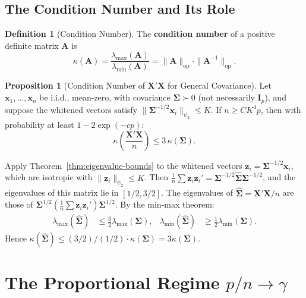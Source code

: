 \documentclass[12pt,a4paper]{article}
\makeatletter
\theoremstyle{definition}
\newtheorem{definition}[theorem]{Definition}
\newtheorem{proposition}[theorem]{Proposition}
\renewenvironment{proof}[1][\proofname]{\par
  \pushQED{\qed}%
  \normalfont \topsep6\p@\@plus6\p@\relax
  \trivlist
  \item[\hskip\labelsep\bfseries #1\@addpunct{.}]\ignorespaces
}{%
  \popQED\endtrivlist\@endpefalse
}
\newcommand{\bX}{\mathbf{X}}
\newcommand{\bx}{\mathbf{x}}
\newcommand{\bI}{\mathbf{I}}
\newcommand{\bz}{\mathbf{z}}
\newcommand{\bA}{\mathbf{A}}
\newcommand{\bSigma}{\boldsymbol{\Sigma}}
\newcommand{\hbSigma}{\hat{\boldsymbol{\Sigma}}}
\newcommand{\opnorm}[1]{\|#1\|_{\mathrm{op}}}
\makeatother
\begin{document}
\subsection{The Condition Number and Its Role}

\begin{definition}[Condition Number]\label{def:condition-number}
The \textbf{condition number} of a positive definite matrix $\bA$ is
\begin{equation}\label{eq:condition-number}
\kappa(\bA) = \frac{\lambda_{\max}(\bA)}{\lambda_{\min}(\bA)} = \opnorm{\bA}\cdot\opnorm{\bA^{-1}}.
\end{equation}
\end{definition}

\begin{proposition}[Condition Number of $\bX'\bX$ for General Covariance]\label{prop:kappa-general}
Let $\bx_1, \ldots, \bx_n$ be i.i.d., mean-zero, with covariance $\bSigma \succ 0$ (not necessarily $\bI_p$), and suppose the whitened vectors satisfy $\|\bSigma^{-1/2}\bx_i\|_{\psi_2} \leqslant K$. If $n \geqslant CK^4 p$, then with probability at least $1 - 2\exp(-cp)$:
\begin{equation}\label{eq:kappa-general}
\kappa\!\left(\frac{\bX'\bX}{n}\right) \leqslant 3\,\kappa(\bSigma).
\end{equation}
\end{proposition}

\begin{proof}
Apply Theorem~\ref{thm:eigenvalue-bounds} to the whitened vectors $\bz_i = \bSigma^{-1/2}\bx_i$, which are isotropic with $\|\bz_i\|_{\psi_2} \leqslant K$. Then $\frac{1}{n}\sum \bz_i\bz_i' = \bSigma^{-1/2}\hbSigma\bSigma^{-1/2}$, and the eigenvalues of this matrix lie in $[1/2, 3/2]$. The eigenvalues of $\hbSigma = \bX'\bX/n$ are those of $\bSigma^{1/2}(\frac{1}{n}\sum\bz_i\bz_i')\bSigma^{1/2}$. By the min-max theorem:
\begin{align*}
\lambda_{\max}(\hbSigma) &\leqslant \frac{3}{2}\lambda_{\max}(\bSigma), &
\lambda_{\min}(\hbSigma) &\geqslant \frac{1}{2}\lambda_{\min}(\bSigma).
\end{align*}
Hence $\kappa(\hbSigma) \leqslant (3/2)/(1/2) \cdot \kappa(\bSigma) = 3\kappa(\bSigma)$.
\end{proof}

\section{The Proportional Regime \texorpdfstring{$p/n \to \gamma$}{p/n -> gamma}}\label{sec:proportional}
\end{document}
